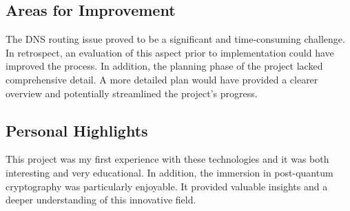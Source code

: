 \subsection{Areas for Improvement}
The DNS routing issue proved to be a significant and time-consuming challenge. In retrospect, an evaluation of this aspect prior to implementation could have improved the process. In addition, the planning phase of the project lacked comprehensive detail. A more detailed plan would have provided a clearer overview and potentially streamlined the project's progress.

\subsection{Personal Highlights}
This project was my first experience with these technologies and it was both interesting and very educational. In addition, the immersion in post-quantum cryptography was particularly enjoyable. It provided valuable insights and a deeper understanding of this innovative field.
